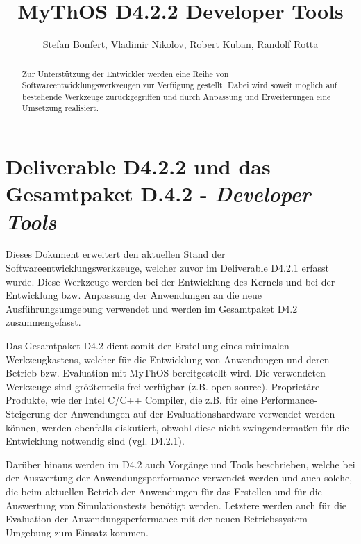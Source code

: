 

\title{MyThOS D4.2.2 Developer Tools}
\author{Stefan Bonfert, Vladimir Nikolov, Robert Kuban, Randolf Rotta}



\maketitle

\begin{abstract}

Zur Unterstützung der Entwickler werden eine Reihe von
Softwareentwicklungswerkzeugen zur Verfügung gestellt. Dabei wird soweit möglich
auf bestehende Werkzeuge zurückgegriffen und durch Anpassung und Erweiterungen
eine Umsetzung realisiert.

\end{abstract}

\newpage
\tableofcontents
\newpage

\section{Deliverable D4.2.2 und das Gesamtpaket D.4.2 - \emph{Developer Tools}}

Dieses Dokument erweitert den aktuellen Stand der Softwareentwicklungswerkzeuge,
welcher zuvor im Deliverable D4.2.1 erfasst wurde.
Diese Werkzeuge werden bei der Entwicklung des Kernels und bei der Entwicklung
bzw. Anpassung der Anwendungen an die neue Ausführungsumgebung verwendet und
werden im Gesamtpaket D4.2 zusammengefasst.

Das Gesamtpaket D4.2 dient somit der Erstellung eines minimalen Werkzeugkastens,
welcher für die Entwicklung von Anwendungen und deren Betrieb bzw. Evaluation
mit MyThOS bereitgestellt wird. Die verwendeten Werkzeuge sind größtenteils frei
verfügbar (z.B. open source). Proprietäre Produkte, wie der Intel C/C++
Compiler, die z.B. für eine Performance-Steigerung der Anwendungen auf der
Evaluationshardware verwendet werden können, werden ebenfalls diskutiert, obwohl
diese nicht zwingendermaßen für die Entwicklung notwendig sind (vgl. D4.2.1).

Darüber hinaus werden im D4.2 auch Vorgänge und Tools beschrieben, welche bei
der Auswertung der Anwendungsperformance verwendet werden und auch solche, die
beim aktuellen Betrieb der Anwendungen für das Erstellen und für die Auswertung
von Simulationstests benötigt werden. Letztere werden auch für die Evaluation
der Anwendungsperformance mit der neuen Betriebssystem-Umgebung zum Einsatz
kommen. 

